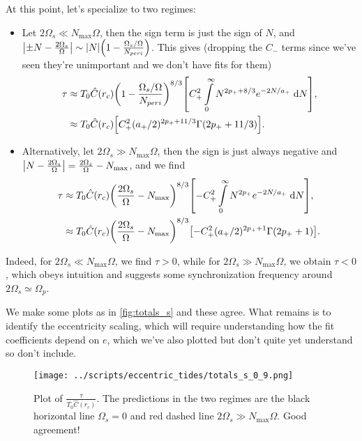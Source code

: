 \documentclass[11pt,
        usenames, %
        dvipsnames %
    ]{article}
\DeclarePairedDelimiter\abs{\lvert}{\rvert}
\DeclarePairedDelimiter\p{\lparen}{\rparen}
\DeclarePairedDelimiter\s{\lbrack}{\rbrack}
\begin{document}
At this point, let's specialize to two regimes:
\begin{itemize}
    \item Let $2\Omega_s \ll N_{\max} \Omega$, then the sign term is just the
        sign of $N$, and $\abs*{\pm N - \frac{2\Omega_s}{\Omega}} \sim
        \abs*{N}\p*{1 - \frac{\Omega_s/\Omega}{N_{peri}}}$. This gives
        (dropping the $C_-$ terms since we've seen they're unimportant and we
        don't have fits for them)
        \begin{align}
            \tau &\approx T_0 \hat{C}(r_c)
                \p*{1 - \frac{\Omega_s/\Omega}{N_{peri}}}^{8/3}
            \s*{
                C_+^2\int\limits_0^{\infty}
                    N^{2p_+ + 8/3}e^{-2N/a_+}\;\mathrm{d}N},\\
                &\approx T_0\hat{C}(r_c)\s*{
                    C_+^2 (a_+/2)^{2p_+ + 11/3} \Gamma\p*{2p_+ + 11/3}}.
        \end{align}

    \item Alternatively, let $2\Omega_s \gg N_{\max}\Omega$, then the sign is
        just always negative and $\abs*{N - \frac{2\Omega_s}{\Omega}} =
        \frac{2\Omega_s}{\Omega} - N_{\max}$, and we find
        \begin{align}
            \tau &\approx T_0 \hat{C}(r_c) \p*{\frac{2\Omega_s}{\Omega} -
                    N_{\max}}^{8/3}
                \s*{-C_+^2\int\limits_0^{\infty}
                    N^{2p_+}e^{-2N/a_+}\;\mathrm{d}N},\\
                &\approx T_0\hat{C}(r_c)
                    \p*{\frac{2\Omega_s}{\Omega} - N_{\max}}^{8/3}\s*{
                        -C_+^2 (a_+/2)^{2p_+ + 1} \Gamma\p*{2p_+ + 1}}.
        \end{align}
\end{itemize}
Indeed, for $2\Omega_s \ll N_{\max}\Omega$, we find $\tau > 0$, while for
$2\Omega_s \gg N_{\max} \Omega$, we obtain $\tau < 0$, which obeys intuition and
suggests some synchronization frequency around $2\Omega_s \simeq \Omega_p$.

We make some plots as in \autoref{fig:totals_s} and these agree. What remains is
to identify the eccentricity scaling, which will require understanding how the
fit coefficients depend on $e$, which we've also plotted but don't quite yet
understand so don't include.
\begin{figure}[t]
    \centering
    \texttt{[image: ../scripts/eccentric\_tides/totals\_s\_0\_9.png]}
    \caption{Plot of $\frac{\tau}{T_0 \hat{C}(r_c)}$. The predictions in the two
    regimes are the black horizontal line $\Omega_s = 0$ and red dashed line
    $2\Omega_s \gg N_{\max}\Omega$. Good agreement!}\label{fig:totals_s}
\end{figure}
\end{document}
